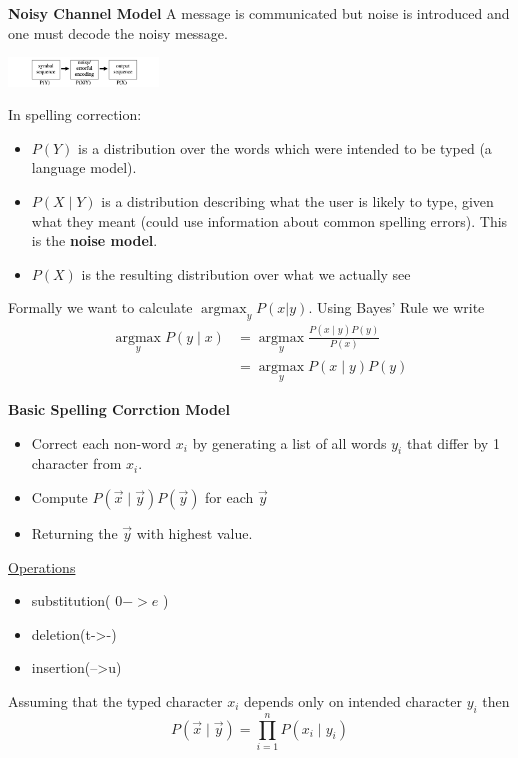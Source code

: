\documentclass[8pt]{extarticle} %
\begin{document}
\begin{multicols*}{3}
\textbf{Noisy Channel Model} A message is communicated but noise is introduced and one must decode the noisy message.
\begin{center}
    \includegraphics[width=0.3\textwidth]{media/noisy-channel.png}
\end{center}
In spelling correction:
\begin{itemize}[label=\textbullet, labelsep=0.3em, leftmargin=0.5em, itemsep=0em]
\item $P(Y)$ is a distribution over the words which were intended to be typed (a language model).
\item $P(X \mid Y)$ is a distribution describing what the user is likely to type, given what they meant (could use information about common spelling errors). This is the \textbf{noise model}.
\item $P(X)$ is the resulting distribution over what we actually see
\end{itemize}
Formally we want to calculate $\operatorname{argmax}_{y}P(x|y)$.
Using Bayes' Rule we write
$$\begin{aligned} 
    \underset{y}{\operatorname{argmax}} P(y \mid x) & =\underset{y}{\operatorname{argmax}} \frac{P(x \mid y) P(y)}{P(x)} \\ 
    & =\underset{y}{\operatorname{argmax}} P(x \mid y) P(y)
\end{aligned}$$

\textbf{Basic Spelling Corrction Model}
\begin{itemize}[label=\textbullet, labelsep=0.3em, leftmargin=0.5em, itemsep=0em]
\item Correct each non-word $x_i$ by generating a list of all words $y_i$ that differ by 1 character from $x_i$.
\item Compute $P(\vec{x} \mid \vec{y}) P(\vec{y})$ for each $\vec{y}$ 
\item Returning the $\vec{y}$ with highest value. 
\end{itemize}

\underline{Operations}
\begin{itemize}[label=\textbullet, labelsep=0.3em, leftmargin=0.5em, itemsep=0em]
    \item substitution( $0->e$ )
    \item deletion(t->-)
    \item insertion(-->u)
\end{itemize}
Assuming that the typed character $x_i$ depends only on intended character $y_i$ then
$$
P(\vec{x} \mid \vec{y})=\prod_{i=1}^n P\left(x_i \mid y_i\right)
$$


\end{multicols*}
\end{document}
